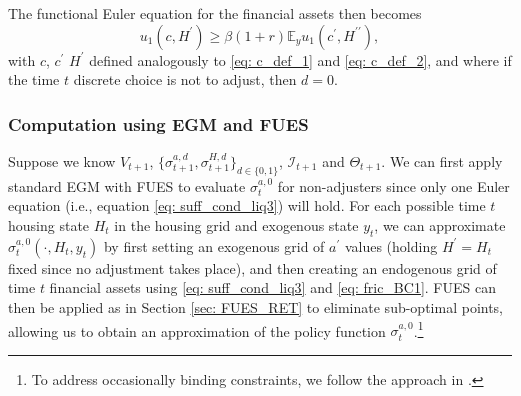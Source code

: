 \documentclass[12pt]{article}
\begin{document}

The functional Euler equation for the financial assets then becomes
%
\begin{equation}\label{eq: suff_cond_liq3}
    u_{1}(c, H^{\prime}) \geq \beta (1+r) \mathbb{E}_{y}u_{1}(c^{\prime}, H^{\prime\prime}),
\end{equation}
%
with $c$, $c^{\prime}$ $H^{\prime}$  defined analogously to \eqref{eq: c_def_1} and \eqref{eq: c_def_2}, and where if the time $t$ discrete choice is not to adjust, then $d=0$. 


\subsubsection{Computation using EGM and FUES}\label{sec: egm_app2}

Suppose we know $V_{t+1}$, $\{\sigma_{t+1}^{a, d},\sigma_{t+1}^{H,d}\}_{d\in \{0,1\}}$, $\mathcal{I}_{t+1}$ and $\Theta_{t+1}$. We can first apply standard EGM with FUES to evaluate $\sigma_{t}^{a,0}$ for non-adjusters since only one Euler equation (i.e., equation \eqref{eq: suff_cond_liq3}) will hold. For each possible time $t$ housing state $H_{t}$ in the housing grid and exogenous state $y_{t}$, we can approximate $\sigma_{t}^{a,0}(\cdot, H_{t}, y_{t})$ by first setting an exogenous grid of $a^{\prime}$ values (holding $H^{\prime} = H_{t}$ fixed since no adjustment takes place), and then creating an endogenous grid of time $t$ financial assets using \eqref{eq: suff_cond_liq3} and \eqref{eq: fric_BC1}. FUES can then be applied as in Section \ref{sec: FUES_RET} to eliminate sub-optimal points, allowing us to obtain an approximation of the policy function $\sigma_{t}^{a,0}$.\footnote{To address occasionally binding constraints, we follow the approach in \cite{DS2024RFC}.}
\end{document}
